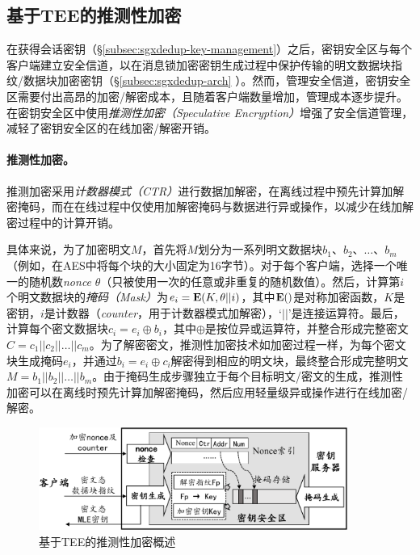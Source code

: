 \subsection{基于TEE的推测性加密}
\label{subsec:sgxdedup-encryption}

在获得会话密钥（\S\ref{subsec:sgxdedup-key-management}）之后，密钥安全区与每个客户端建立安全信道，以在消息锁加密密钥生成过程中保护传输的明文数据块指纹/数据块加密密钥（\S\ref{subsec:sgxdedup-arch} ）。然而，管理安全信道，密钥安全区需要付出高昂的加密/解密成本，且随着客户端数量增加，管理成本逐步提升。\sysnameS 在密钥安全区中使用\textit{推测性加密（Speculative Encryption）}\cite{eduardo2019Speculative}增强了安全信道管理，减轻了密钥安全区的在线加密/解密开销。

\paragraph*{推测性加密。}推测加密\cite{eduardo2019Speculative}采用\textit{计数器模式（CTR）}\cite{counter}进行数据加解密，在离线过程中预先计算加解密掩码，而在在线过程中仅使用加解密掩码与数据进行异或操作，以减少在线加解密过程中的计算开销。

具体来说，为了加密明文$M$，首先将$M$划分为一系列明文数据块$b_1、b_2、\ldots、b_m$（例如，在AES中将每个块的大小固定为16字节）。对于每个客户端，选择一个唯一的随机数\textit{nonce} $\theta$（只被使用一次的任意或非重复的随机数值）。然后，计算第$i$个明文数据块的\textit{掩码（Mask）}为$e_i = {\bf E}(K, \theta || i)$，其中${\bf E}()$是对称加密函数，$K$是密钥，$i$是计数器（\textit{counter}，用于计数器模式加解密），‘$||$’是连接运算符。最后，计算每个密文数据块$c_i = e_i \oplus b_i $，其中$\oplus$是按位异或运算符，并整合形成完整密文$C = c_1 || c_2 || \ldots || c_m$。为了解密密文，推测性加密技术如加密过程一样，为每个密文块生成掩码$e_i$，并通过$b_i = e_i \oplus c_i $解密得到相应的明文块，最终整合形成完整明文$M = b_1 || b_2 || \ldots || b_m$。由于掩码生成步骤独立于每个目标明文/密文的生成，推测性加密可以在离线时预先计算加解密掩码，然后应用轻量级异或操作进行在线加密/解密。

\begin{figure}[!htb]
\centering
\includegraphics[width=0.9\textwidth]{pic/sgxdedup/key-enclave-arch.pdf}
\caption{基于TEE的推测性加密概述}
\label{fig:sgxdedup-SpecEnc}
\end{figure}

